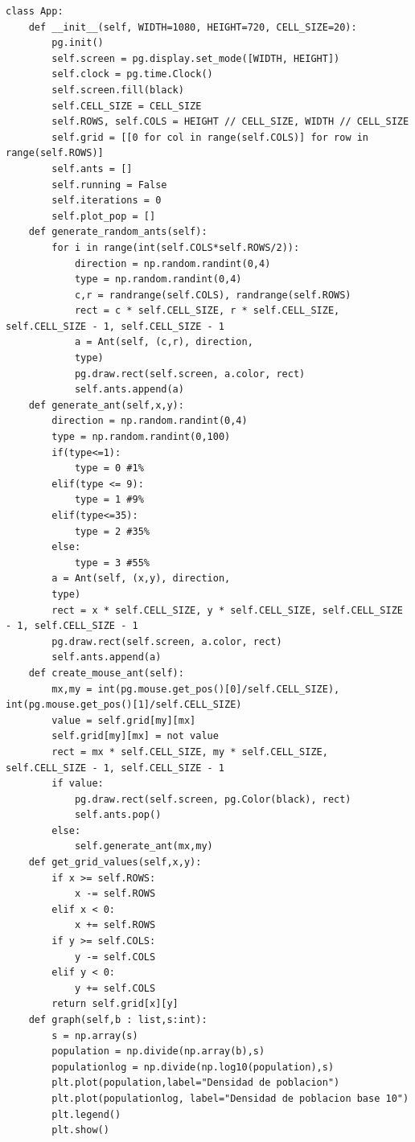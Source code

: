 \documentclass[10pt]{article}
\begin{document}
\begin{verbatim}
class App:
    def __init__(self, WIDTH=1080, HEIGHT=720, CELL_SIZE=20):
        pg.init()
        self.screen = pg.display.set_mode([WIDTH, HEIGHT])
        self.clock = pg.time.Clock()
        self.screen.fill(black)
        self.CELL_SIZE = CELL_SIZE
        self.ROWS, self.COLS = HEIGHT // CELL_SIZE, WIDTH // CELL_SIZE
        self.grid = [[0 for col in range(self.COLS)] for row in range(self.ROWS)]
        self.ants = []
        self.running = False
        self.iterations = 0
        self.plot_pop = []
    def generate_random_ants(self):
        for i in range(int(self.COLS*self.ROWS/2)):
            direction = np.random.randint(0,4)
            type = np.random.randint(0,4)
            c,r = randrange(self.COLS), randrange(self.ROWS)
            rect = c * self.CELL_SIZE, r * self.CELL_SIZE, self.CELL_SIZE - 1, self.CELL_SIZE - 1
            a = Ant(self, (c,r), direction, 
            type)
            pg.draw.rect(self.screen, a.color, rect)
            self.ants.append(a)
    def generate_ant(self,x,y):
        direction = np.random.randint(0,4)
        type = np.random.randint(0,100)
        if(type<=1):
            type = 0 #1%
        elif(type <= 9):
            type = 1 #9%
        elif(type<=35):
            type = 2 #35%
        else:
            type = 3 #55%
        a = Ant(self, (x,y), direction, 
        type)
        rect = x * self.CELL_SIZE, y * self.CELL_SIZE, self.CELL_SIZE - 1, self.CELL_SIZE - 1
        pg.draw.rect(self.screen, a.color, rect)
        self.ants.append(a) 
    def create_mouse_ant(self):
        mx,my = int(pg.mouse.get_pos()[0]/self.CELL_SIZE), int(pg.mouse.get_pos()[1]/self.CELL_SIZE)
        value = self.grid[my][mx]
        self.grid[my][mx] = not value
        rect = mx * self.CELL_SIZE, my * self.CELL_SIZE, self.CELL_SIZE - 1, self.CELL_SIZE - 1
        if value:
            pg.draw.rect(self.screen, pg.Color(black), rect)
            self.ants.pop()
        else:
            self.generate_ant(mx,my)
    def get_grid_values(self,x,y):
        if x >= self.ROWS:
            x -= self.ROWS
        elif x < 0:
            x += self.ROWS
        if y >= self.COLS:
            y -= self.COLS
        elif y < 0:
            y += self.COLS
        return self.grid[x][y]
    def graph(self,b : list,s:int):
        s = np.array(s)
        population = np.divide(np.array(b),s)
        populationlog = np.divide(np.log10(population),s)
        plt.plot(population,label="Densidad de poblacion")
        plt.plot(populationlog, label="Densidad de poblacion base 10")
        plt.legend()
        plt.show()
    

\end{verbatim}
\end{document}
